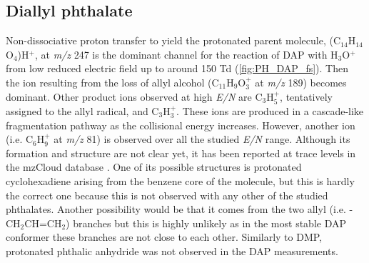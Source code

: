 

\subsection{Diallyl phthalate}
%


Non-dissociative proton transfer to yield the protonated parent molecule, (C$_{14}$H$_{14}$O$_4$)H$^+$, at \textit{m/z} 247 is the dominant channel for the reaction of DAP with H$_3$O$^+$ from low reduced electric field up to around 150 Td (\autoref{fig:PH_DAP_fs}). Then the ion resulting from the loss of allyl alcohol (C$_{11}$H$_9$O$_3^+$ at \textit{m/z} 189) becomes dominant. Other product ions observed at high \textit{E/N} are C$_3$H$_5^+$, tentatively assigned to  the allyl radical,  and C$_3$H$_3^+$.
%
These ions are produced in a cascade-like fragmentation pathway as the collisional energy increases.
%
However, another ion (i.e. C$_6$H$_9^+$ at \textit{m/z} 81) is observed over all the studied \textit{E/N} range.
%
Although its formation and structure are not clear yet, it has been reported at trace levels in the mzCloud database \cite{mzcloudDAP}.
%
One of its possible structures is protonated cyclohexadiene arising from the benzene core of the molecule, but this is hardly the correct one because this  is not observed with any other of the studied phthalates.
%
Another possibility would be that it comes from the two allyl (i.e. -CH$_2$CH=CH$_2$) branches but this is highly unlikely as in the most stable DAP conformer these branches are not close to each other.
%
Similarly to DMP, protonated phthalic anhydride was not observed in the DAP measurements.
%
